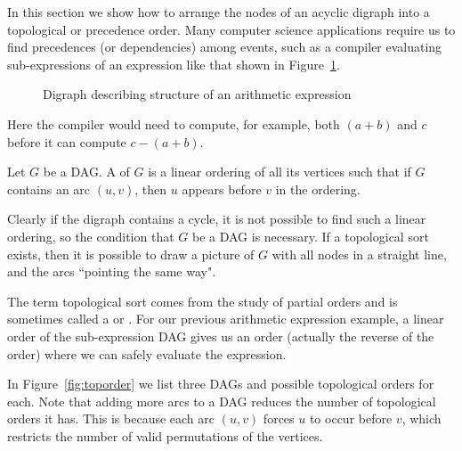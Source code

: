 In this section we show how to arrange the nodes of an acyclic digraph
into a topological or precedence order.  Many computer science
applications require us to find precedences (or dependencies) among
events, such as a compiler evaluating sub-expressions of an expression
like that shown in Figure~\ref{fig:prec}.

\begin{figure}[hbtp]
\label{fig:prec}


\centerline{}

\caption{Digraph describing structure of an arithmetic expression}
\end{figure}

Here the compiler would need to compute, for example, both $(a+b)$ and
$c$ before it can compute $c-(a+b)$.



\begin{Definition}

Let $G$ be a DAG. A  of $G$ is a linear
ordering of all its vertices such that if $G$ contains an arc $(u,v)$,
then $u$ appears before $v$ in the ordering.

\end{Definition}

\begin{note}
Clearly if the digraph contains a cycle, it is not possible to find such
a linear ordering, so the condition that $G$ be a DAG is necessary. If a
topological sort exists, then it is possible to draw a picture  of $G$
with all nodes in a straight line, and the arcs ``pointing the same
way".
\end{note}

The term topological sort comes from the study of partial orders and is
sometimes called a  or .  For our previous arithmetic expression example, a linear
order of the sub-expression DAG gives us an order (actually the reverse
of the order) where we can safely evaluate the expression.

\begin{Example}
\label{eg:toporder}

In Figure~\ref{fig:toporder} we list three DAGs and possible topological
orders for each. Note that adding more arcs to a DAG  reduces the number
of topological orders it has.  This is because each arc $(u,v)$ forces
$u$ to occur before $v$, which restricts the number of valid permutations
of the vertices.

\end{Example}


